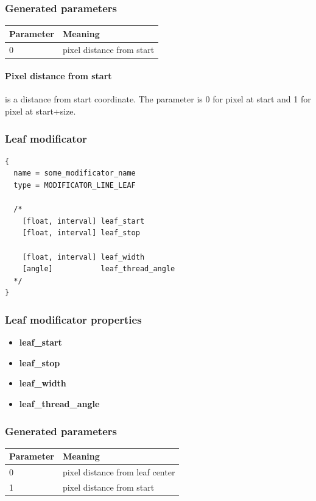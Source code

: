 \documentclass[9pt]{article}
\begin{document}
\subsubsection*{Generated parameters}

\begin{center}
\begin{tabular}{|l||l|}
\hline
  Parameter & Meaning \\
\hline
\hline
  0 & pixel distance from start \\
\hline
\end{tabular}
\end{center}

\paragraph*{Pixel distance from start} is a distance from start coordinate. 
The parameter is 0 for pixel at start and 1 for pixel at start+size.

\newpage
\subsubsection{Leaf modificator}

\begin{verbatim}
{
  name = some_modificator_name
  type = MODIFICATOR_LINE_LEAF

  /*
    [float, interval] leaf_start
    [float, interval] leaf_stop
  
    [float, interval] leaf_width
    [angle]           leaf_thread_angle
  */
}
\end{verbatim}
\subsubsection*{Leaf modificator properties}
\begin{itemize}
\item{\bf leaf\_start}
\item{\bf leaf\_stop}
\item{\bf leaf\_width}
\item{\bf leaf\_thread\_angle}
\end{itemize}

\subsubsection*{Generated parameters}

\begin{center}
\begin{tabular}{|l||l|}
\hline
  Parameter & Meaning \\
\hline
\hline
  0 & pixel distance from leaf center \\
  1 & pixel distance from start \\  
\hline
\end{tabular}
\end{center}
\end{document}
